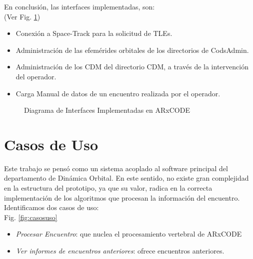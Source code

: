 En conclusi\'on, las interfaces implementadas, son:\\
 (Ver Fig. \ref{fig:interfacesImpl})\\
\begin{itemize}
\itemsep0em
 \item Conexi\'on a Space-Track para la solicitud de TLEs.
 \item Administraci\'on de las efem\'erides orbitales de los directorios de CodsAdmin.
 \item Administraci\'on de los CDM del directorio CDM, a trav\'es de la intervenci\'on del operador.
 \item Carga Manual de datos de un encuentro realizada por el operador.
\end{itemize}

\begin{figure}
\centering
  \caption[Diagrama de Interfaces Implementadas en ARxCODE]{Diagrama de Interfaces Implementadas en ARxCODE}
  \label{fig:interfacesImpl}
\end{figure}

\section{Casos de Uso}

Este trabajo se pens\'o como un sistema acoplado al software principal del departamento de Din\'amica Orbital. En este sentido, no existe gran complejidad en la estructura del prototipo, ya que su valor, radica en la correcta implementaci\'on de los algoritmos que procesan la informaci\'on del encuentro. Identificamos dos casos de uso:\\
Fig. \ref{fig:casosuso}
 
 
\begin{itemize}
 \item {\it{Procesar Encuentro}}: que nuclea el procesamiento vertebral de ARxCODE
 \item {\it{Ver informes de encuentros anteriores}}: ofrece encuentros anteriores.
\end{itemize}

